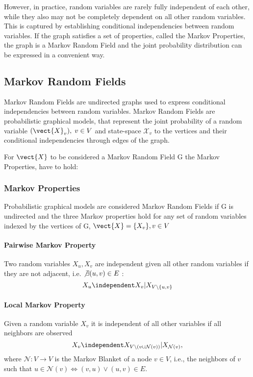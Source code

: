 However, in practice, random variables are rarely fully independent of each other, while they also may not be completely dependent on all other random variables.
This is captured by establishing conditional independencies between random variables.
If the graph satisfies a set of properties, called the Markov Properties, the graph is a Markov Random Field and the joint probability distribution can be expressed in a convenient way.

\subsection{Markov Random Fields}
Markov Random Fields are undirected graphs used to express conditional independencies between random variables. 
Markov Random Fields are probabilistic graphical models, that represent the joint probability of a random variable $(\vect{X}_v), \; v \in V$ and state-space $\mathcal{X}_v$ \wrt to the vertices and their conditional independencies through edges of the graph. 

For $\vect{X}$ to be considered a Markov Random Field \wrt G the Markov Properties, have to hold:

\subsubsection*{Markov Properties}
Probabilistic graphical models are considered Markov Random Fields if G is undirected and the three Markov properties hold for any set of random variables indexed by the vertices of G, $\vect{X} = \{X_v\}, v \in V$

\paragraph*{Pairwise Markov Property}
Two random variables $X_u, X_v$ are independent given all other random variables if they are not adjacent, i.e. $\not\exists (u,v) \in E$ :
\begin{equation}
    X_u \independent X_v \lvert X_{V \setminus\{u,v\}}
\end{equation}

\paragraph*{Local Markov Property}
Given a random variable $X_v$ it is independent of all other variables if all neighbors are observed 
\begin{equation}
    X_v \independent X_{V\setminus (v \cup \mathcal{N}(v))} \lvert X_{\mathcal{N}(v)},   
\end{equation}
where $\mathcal{N}: V \rightarrow V$ is the Markov Blanket of a node $v \in V$, i.e., the neighbors of $v$ such that $u \in \mathcal{N}(v) \Leftrightarrow (v,u) \vee (u,v) \in E$.


